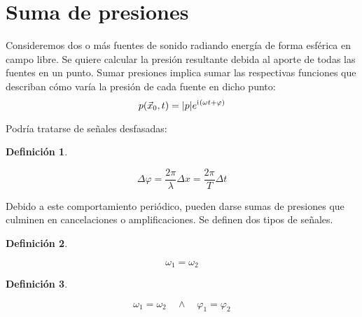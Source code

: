 \documentclass[a5paper,12pt,twoside]{book}
\newtheorem{defn}{{Definición}}[chapter]
\begin{document}
\section{Suma de presiones}

Consideremos dos o más fuentes de sonido radiando energía de forma esférica en campo libre.
Se quiere calcular la presión resultante debida al aporte de todas las fuentes en un punto.
Sumar presiones implica sumar las respectivas funciones que describan cómo varía la presión de cada fuente en dicho punto:
\begin{equation*}
    p(\Vec{x}_0,t) = {\left| {p} \right|} e^{\mathrm{i}\mkern1mu(\omega t + \varphi)}
\end{equation*}

Podría tratarse de señales desfasadas:

\begin{mdframed}[style=MyFrame1]
    \begin{defn}
    \end{defn}
    \begin{equation*}
        \Delta \varphi = \frac{2\pi}{\lambda} \Delta x = \frac{2\pi}{T} \Delta t
    \end{equation*}
\end{mdframed}

Debido a este comportamiento periódico, pueden darse sumas de presiones que culminen en cancelaciones o amplificaciones.
Se definen dos tipos de señales.

\begin{mdframed}[style=MyFrame1]
    \begin{defn}
    \end{defn}
    \begin{equation*}
        \omega_1=\omega_2
    \end{equation*}
\end{mdframed}

\begin{mdframed}[style=MyFrame1]
    \begin{defn}
    \end{defn}
    \begin{equation*}
        \omega_1=\omega_2 \quad \land \quad \varphi_1=\varphi_2
    \end{equation*}
\end{mdframed}
\end{document}
